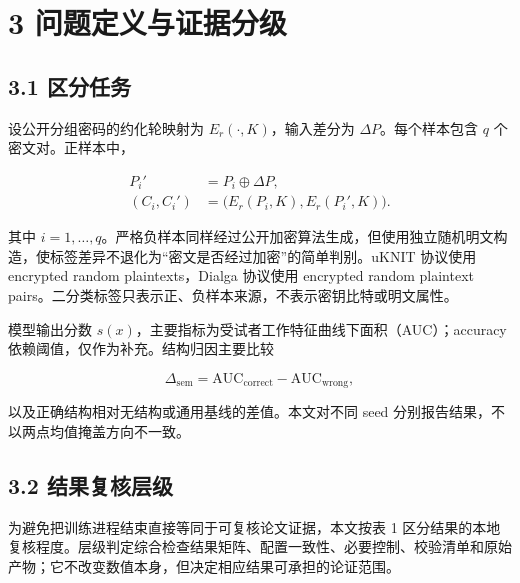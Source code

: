 \documentclass{templates/cjc-utf8}
\newcommand{\papertabletitle}{}
\newcommand{\papertablecaption}[1]{\gdef\papertabletitle{#1}}
\begin{document}
\hypertarget{ux95eeux9898ux5b9aux4e49ux4e0eux8bc1ux636eux5206ux7ea7}{%
\section{3
问题定义与证据分级}\label{ux95eeux9898ux5b9aux4e49ux4e0eux8bc1ux636eux5206ux7ea7}}

\hypertarget{ux533aux5206ux4efbux52a1}{%
\subsection{3.1 区分任务}\label{ux533aux5206ux4efbux52a1}}

设公开分组密码的约化轮映射为 \(E_r(\cdot,K)\)，输入差分为
\(\Delta P\)。每个样本包含 \(q\) 个密文对。正样本中，

\[
\begin{aligned}
P_i' &= P_i\oplus \Delta P,\\
(C_i,C_i') &= \bigl(E_r(P_i,K),E_r(P_i',K)\bigr).
\end{aligned}
\]

其中
\(i=1,\ldots,q\)。严格负样本同样经过公开加密算法生成，但使用独立随机明文构造，使标签差异不退化为``密文是否经过加密''的简单判别。uKNIT
协议使用 encrypted random plaintexts，Dialga 协议使用 encrypted random
plaintext
pairs。二分类标签只表示正、负样本来源，不表示密钥比特或明文属性。

模型输出分数
\(s(x)\)，主要指标为受试者工作特征曲线下面积（AUC）；accuracy
依赖阈值，仅作为补充。结构归因主要比较

\[
\Delta_{\mathrm{sem}}=\mathrm{AUC}_{\mathrm{correct}}-\mathrm{AUC}_{\mathrm{wrong}},
\]

以及正确结构相对无结构或通用基线的差值。本文对不同 seed
分别报告结果，不以两点均值掩盖方向不一致。

\hypertarget{ux8bc1ux636eux72b6ux6001}{%
\subsection{3.2 结果复核层级}\label{ux8bc1ux636eux72b6ux6001}}

为避免把训练进程结束直接等同于可复核论文证据，本文按表 1
区分结果的本地复核程度。层级判定综合检查结果矩阵、配置一致性、必要控制、校验清单和原始产物；它不改变数值本身，但决定相应结果可承担的论证范围。

\papertablecaption{实验结果的复核层级}
\end{document}
